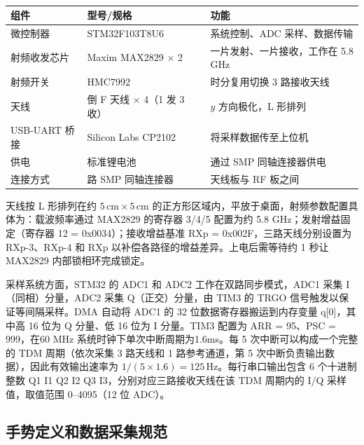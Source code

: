 \begin{table}[htbp]
    \centering
    \caption{}
    \label{tab:hardware}
    {\setlength{\extrarowheight}{2pt}%
    \begin{tabularx}{\linewidth}{|>{\centering\arraybackslash}p{2.5cm}|>{\centering\arraybackslash}X|>{\centering\arraybackslash}X|}
        \hline
        \textbf{组件} & \textbf{型号/规格} & \textbf{功能} \\
        \hline
        微控制器 & STM32F103T8U6 & 系统控制、ADC 采样、数据传输 \\
        \hline
        射频收发芯片 & Maxim MAX2829 $\times$ 2 & 一片发射、一片接收，工作在 5.8 GHz \\
        \hline
        射频开关 & HMC7992 & 时分复用切换 3 路接收天线 \\
        \hline
        天线 & 倒 F 天线 $\times$ 4（1 发 3 收） & $y$ 方向极化，L 形排列 \\
        \hline
        USB-UART 桥接 & Silicon Labs CP2102 & 将采样数据传至上位机 \\
        \hline
        供电 & 标准锂电池 & 通过 SMP 同轴连接器供电 \\
        \hline
        连接方式 & 4 路 SMP 同轴连接器 & 天线板与 RF 板之间 \\
        \hline
    \end{tabularx}}
\end{table}

天线按 L 形排列在约 $5\,\text{cm} \times 5\,\text{cm}$ 的正方形区域内，平放于桌面，射频参数配置具体为：载波频率通过 MAX2829 的寄存器 3/4/5 配置为约 5.8 GHz；发射增益固定（寄存器 12 = 0x0034）；接收增益基准 RXp = 0x002F，三路天线分别设置为 RXp-3、RXp-4 和 RXp 以补偿各路径的增益差异。上电后需等待约 1 秒让 MAX2829 内部锁相环完成锁定。

采样系统方面，STM32 的 ADC1 和 ADC2 工作在双路同步模式，ADC1 采集 I（同相）分量，ADC2 采集 Q（正交）分量，由 TIM3 的 TRGO 信号触发以保证等间隔采样。DMA 自动将 ADC1 的 32 位数据寄存器搬运到内存变量 q[0]，其中高 16 位为 Q 分量、低 16 位为 I 分量。TIM3 配置为 ARR = 95、PSC = 999，在60 MHz 系统时钟下单次中断周期为1.6ms。每 5 次中断可以构成一个完整的 TDM 周期（依次采集 3 路天线和 1 路参考通道，第 5 次中断负责输出数据），因此有效输出速率为 $1/(5\times1.6) = 125\,\text{Hz}$。每行串口输出包含 6 个十进制整数 Q1 I1 Q2 I2 Q3 I3，分别对应三路接收天线在该 TDM 周期内的 I/Q 采样值，取值范围 0--4095（12 位 ADC）。

\subsection{手势定义和数据采集规范}


